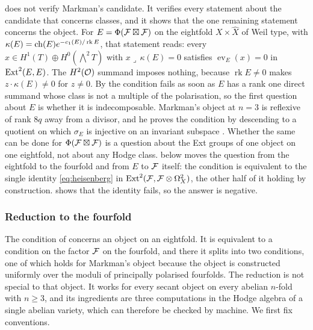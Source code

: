 \begin{remark}\label{rem:onecondition}
 does not verify Markman's candidate. It verifies every
statement about the candidate that concerns classes, and it shows that the
one remaining statement concerns the object. For
$E=\Phi(\mathcal{F}\boxtimes\mathcal{F})$ on the eightfold $X\times\widehat X$ of Weil type,
with $\kappa(E)=\operatorname{ch}(E)e^{-c_{1}(E)/\operatorname{rk}E}$, that statement reads:
every $x\in H^{1}(T)\oplus H^{0}(\bigwedge^{2}T)$ with
$x\lrcorner\,\kappa(E)=0$ satisfies $\operatorname{ev}_{E}(x)=0$ in
$\operatorname{Ext}^{2}(E,E)$. The $H^{2}(\mathcal{O})$ summand imposes nothing, because
$\operatorname{rk}E\ne0$ makes $z\cdot\kappa(E)\ne0$ for $z\ne0$. By
 the condition fails as soon as $E$ has a rank one
direct summand whose class is not a multiple of the polarisation, so the
first question about $E$ is whether it is indecomposable. Markman's object
at $n=3$ is reflexive of rank $8q$ away from a divisor, and he proves the
condition by descending to a quotient on which $\sigma_{E}$ is injective on
an invariant subspace \cite[Proposition 11.5]{Mar25b}. Whether the same can
be done for $\Phi(\mathcal{F}\boxtimes\mathcal{F})$ is a question about the Ext groups of one
object on one eightfold, not about any Hodge class.  below
moves the question from the eightfold to the fourfold and from $E$ to $\mathcal{F}$
itself: the condition is equivalent to the single identity
\eqref{eq:heisenberg} in $\operatorname{Ext}^{2}(\mathcal{F},\mathcal{F}\otimes\Omega^{2}_{X})$, the other
half of it holding by construction.  shows that the
identity fails, so the answer is negative.
\end{remark}

\subsubsection*{Reduction to the fourfold}

The condition of  concerns an object on an eightfold.
It is equivalent to a condition on the factor $\mathcal{F}$ on the fourfold, and
there it splits into two conditions, one of which holds for Markman's object
because the object is constructed uniformly over the moduli of principally
polarised fourfolds. The reduction is not special to that object. It works
for every secant object on every abelian $n$-fold with $n\ge3$, and its
ingredients are three computations in the Hodge algebra of a single abelian
variety, which can therefore be checked by machine. We first fix
conventions.


